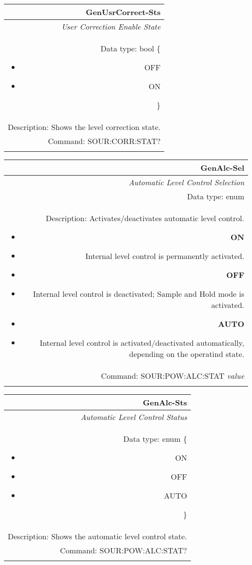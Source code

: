 \documentclass[openany]{article}
\begin{document}
		\begin{tabular}{N}
			\hline
			\bfseries GenUsrCorrect-Sts \\ \hline
			\emph{User Correction Enable State} \\
			Data type: bool \{\begin{itemize}[noitemsep]
				\small
				\item[] OFF
				\item[] ON
			\end{itemize}\} \\
			Description: Shows the level correction state. \\
			Command: SOUR:CORR:STAT? \\
			\\

		\end{tabular}


		\begin{tabular}{N}
			\hline
			\bfseries GenAlc-Sel \\ \hline
			\emph{Automatic Level Control Selection} \\
			Data type: enum \\
			Description: Activates/deactivates automatic level control. \begin{itemize}[noitemsep]
				\small
				\item[] \textbf{ON}
				\item[] Internal level control is permanently activated.
				\item[] \textbf{OFF}
				\item[] Internal level control is deactivated; Sample and Hold mode is activated.
				\item[] \textbf{AUTO}
				\item[] Internal level control is activated/deactivated automatically, depending on the operatind state.
			\end{itemize} \\
			Command: SOUR:POW:ALC:STAT \emph{value} \\
			\\ 

		\end{tabular}


		\begin{tabular}{N}
			\hline
			\bfseries GenAlc-Sts \\ \hline
			\emph{Automatic Level Control Status} \\
			Data type: enum \{\begin{itemize}[noitemsep]
				\small
				\item[] ON
				\item[] OFF
				\item[] AUTO
			\end{itemize}\} \\
			Description: Shows the automatic level control state. \\
			Command: SOUR:POW:ALC:STAT? \\
			\\ 

		\end{tabular}
\end{document}
